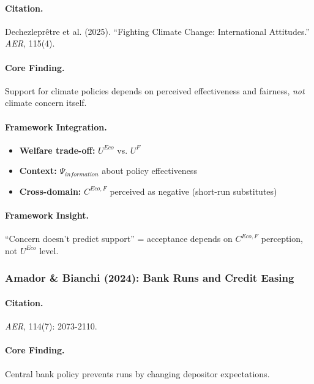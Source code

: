 \documentclass[12pt,a4paper]{article}
\begin{document}
\paragraph{Citation.}
Dechezleprêtre et al. (2025). ``Fighting Climate Change: International Attitudes.''
\emph{AER}, 115(4).

\paragraph{Core Finding.}
Support for climate policies depends on perceived effectiveness and fairness,
\emph{not} climate concern itself.

\paragraph{Framework Integration.}
\begin{itemize}
  \item \textbf{Welfare trade-off:} $U^{Eco}$ vs. $U^F$
  \item \textbf{Context:} $\Psi_{information}$ about policy effectiveness
  \item \textbf{Cross-domain:} $C^{Eco,F}$ perceived as negative (short-run substitutes)
\end{itemize}

\paragraph{Framework Insight.}
``Concern doesn't predict support'' = acceptance depends on $C^{Eco,F}$ perception,
not $U^{Eco}$ level.

\subsubsection{Amador \& Bianchi (2024): Bank Runs and Credit Easing}

\paragraph{Citation.}
\emph{AER}, 114(7): 2073-2110.

\paragraph{Core Finding.}
Central bank policy prevents runs by changing depositor expectations.
\end{document}
